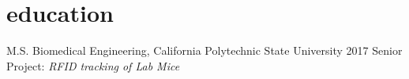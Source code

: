 
\section{education}

\begin{entrylist}


\shortentry
{M.S.}
{Biomedical Engineering,  California Polytechnic State University}
{2017}
{Senior Project: \textit{RFID tracking of Lab Mice}}


\end{entrylist}
